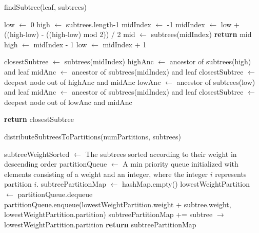 \documentclass{report}
\begin{document}
\begin{algorithm}[H]
\caption{findSubtree(leaf, subtrees)}
\label{findSubtree}

low $\leftarrow$ 0\;
high $\leftarrow$ subtrees.length-1\;
midIndex $\leftarrow$ -1\;
{
	midIndex $\leftarrow$ low + ((high-low) - ((high-low) mod 2)) / 2\;
	mid $\leftarrow$ subtrees(midIndex)\;
	{
		{
			\textbf{return} mid\;
		}
		{
			high $\leftarrow$ midIndex - 1\;
		}
		{
			low $\leftarrow$ midIndex + 1\;
		}
	}
}

closestSubtree $\leftarrow$ subtrees(midIndex)\;
{
	highAnc	$\leftarrow$ ancestor of subtrees(high) and leaf\;
	midAnc $\leftarrow$ ancestor of subtrees(midIndex) and leaf\;
	closestSubtree $\leftarrow$ deepest node out of highAnc and midAnc\;
}
{
	lowAnc	$\leftarrow$ ancestor of subtrees(low) and leaf\;
	midAnc $\leftarrow$ ancestor of subtrees(midIndex) and leaf\;
	closestSubtree $\leftarrow$ deepest node out of lowAnc and midAnc\;
}

\textbf{return} closestSubtree
\end{algorithm}



\begin{algorithm}[H]
\caption{distributeSubtreesToPartitions(numPartitions, subtrees)}
\label{distributeSubtreesToPartitions}


subtreeWeightSorted $\leftarrow$ The subtrees sorted according to their weight in descending order\;
partitionQueue $\leftarrow$ A min priority queue initialized with elements consisting of a weight and an integer, where the integer $i$ represents partition $i$.\;
subtreePartitionMap $\leftarrow$ hashMap.empty()\;
{
	lowestWeightPartition $\leftarrow$ partitionQueue.dequeue\;
        partitionQueue.enqueue(lowestWeightPartition.weight + subtree.weight, lowestWeightPartition.partition)\;
	subtreePartitionMap += subtree $\rightarrow$ lowestWeightPartition.partition\;
}
\textbf{return} subtreePartitionMap

\end{algorithm}
\end{document}
